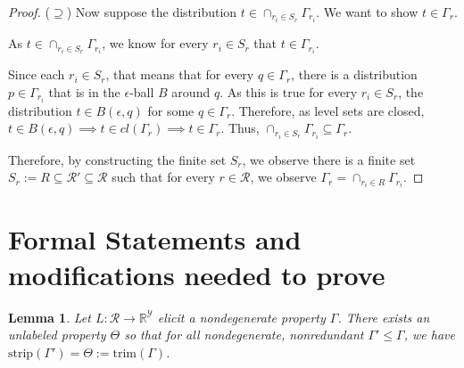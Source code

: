 \documentclass[12pt]{article}
\newcommand{\reals}{\mathbb{R}}
\newcommand{\R}{\mathcal{R}}
\newcommand{\Y}{\mathcal{Y}}
\newcommand{\strip}{\text{strip}}
\newtheorem{lemma}{Lemma}
\begin{document}
\begin{proof}
\bigskip 
($\supseteq$)  Now suppose the distribution $t \in \cap_{r_i \in S_r}\Gamma_{r_i}$.
We want to show $t \in \Gamma_r$.

As $t \in \cap_{r_i \in S_r}\Gamma_{r_i}$, we know for every $r_i \in S_r$ that $t \in \Gamma_{r_i}$.

Since each $r_i \in S_r$, that means that for every $q \in \Gamma_r$, there is a distribution $p \in \Gamma_{r_i}$ that is in the $\epsilon$-ball $B$ around $q$.
As this is true for every $r_i \in S_r$, the distribution $t \in B(\epsilon, q)$ for some $q \in \Gamma_r$. 
Therefore, as level sets are closed, $t \in B(\epsilon, q) \implies t \in cl(\Gamma_r) \implies t \in \Gamma_r$.
Thus, $\cap_{r_i \in S_r}\Gamma_{r_i} \subseteq \Gamma_r$.

Therefore, by constructing the finite set $S_r$, we observe there is a finite set $S_r := R \subseteq \R' \subseteq \R$ such that for every $r \in \R$, we observe $\Gamma_r = \cap_{r_i \in R}\Gamma_{r_i}$.

\end{proof}


\section{Formal Statements and modifications needed to prove}


\begin{lemma}\label{lem:define-trim}
  Let $L: \R \to \reals^\Y$ elicit a nondegenerate property $\Gamma$.
There exists an unlabeled property $\Theta$ so that for all nondegenerate, nonredundant $\Gamma' \leq \Gamma$, we have $\strip(\Gamma') = \Theta := \text{trim}(\Gamma)$.
\end{lemma}
\end{document}
